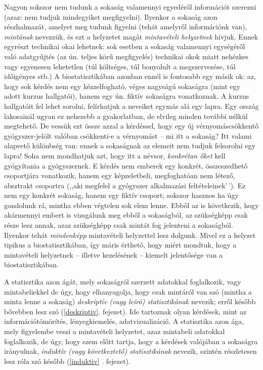 \documentclass[
]{book}
\begin{document}
Nagyon sokszor nem tudunk a sokaság valamennyi egyedéről információt szerezni (azaz: nem tudjuk mindegyiket megfigyelni). Ilyenkor a sokaság azon részhalmazát, amelyet meg tudunk figyelni (tehát amelyről információnk van), \emph{mintának} nevezzük, és ezt a helyzetet magát \emph{mintavételi helyzetnek} hívjuk. Ennek egyrészt technikai okai lehetnek: sok esetben a sokaság valamennyi egységéről való adatgyűjtés (az ún. teljes körű megfigyelés) technikai okok miatt nehézkes vagy egyenesen lehetetlen (túl költséges, túl bonyolult a megszervezése, túl időigényes stb.) A biostatisztikában azonban ennél is fontosabb egy másik ok: az, hogy sok kérdés nem egy kézzelfogható, véges nagyságú sokaságra (mint egy adott kurzus hallgatói), hanem egy ún. fiktív sokaságra vonatkoznak. A kurzus hallgatóit fel lehet sorolni, felírhatjuk a neveiket egymás alá egy lapra. Egy ország lakosainál ugyan ez nehezebb a gyakorlatban, de elvileg minden további nélkül megtehető. De vessük ezt össze azzal a kérdéssel, hogy egy új vérnyomáscsökkentő gyógyszer-jelölt valóban csökkenti-e a vérnyomást -- mi itt a sokaság? Itt valami alapvető különbség van: ennek a sokaságnak az elemeit nem tudjuk felsorolni egy lapra! Soha nem mondhatjuk azt, hogy itt a névsor, \emph{konkrétan őket} kell gyógyítania a gyógyszernek. E kérdés nem emberek egy konkrét, összeszedhető csoportjára vonatkozik, hanem egy képzeletbeli, megfoghatóan nem létező, absztrakt csoportra (,,aki megfelel a gyógyszer alkalmazási feltételeinek'\,'). Ez nem egy konkrét sokaság, hanem egy fiktív csoport; sokszor hasznos ha úgy gondolunk rá, mintha ebben végtelen sok elem lenne. Ebből az is következik, hogy akármennyi embert is vizsgálunk meg ebből a sokaságból, az szükségképp csak része lesz annak, azaz szükségképp csak mintát fog jelenteni a sokaságból. Ilyenkor tehát \emph{mindenképp} mintavételi helyzettel lesz dolgunk. Mivel ez a helyzet tipikus a biostatisztikában, így máris érthető, hogy miért mondtuk, hogy a mintavételi helyzetnek -- illetve kezelésének -- kiemelt jelentősége van a biostatisztikában.

A statisztika azon ágát, mely sokaságról szerzett adatokkal foglalkozik, vagy mintabeliekkel de úgy, hogy elhanyagolja, hogy csak mintáról van szó (mintha a minta lenne a sokaság) \emph{deskriptív (vagy leíró) statisztikának} nevezik; erről később bővebben lesz szó (\ref{deskriptiv}. fejezet). Ide tartoznak olyan kérdések, mint az információtömörítés, lényegkiemelés, adatvizualizáció. A statisztika azon ága, mely figyelembe veszi a mintavételi helyzetet, azaz mintabeli adatokkal foglalkozik, de úgy, hogy szem előtt tartja, hogy a kérdések valójában a sokaságra irányulnak, \emph{induktív (vagy következtető) statisztikának} nevezik, szintén részletesen lesz róla szó később (\ref{induktiv} . fejezet).
\end{document}

